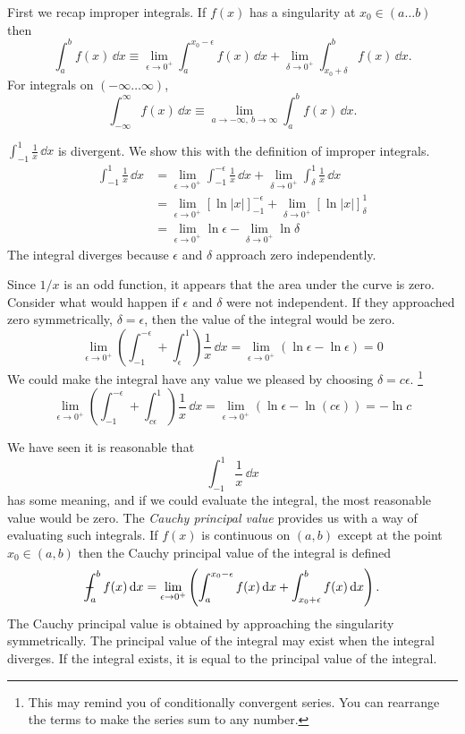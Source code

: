First we recap improper integrals.  If $f(x)$ has a singularity at
$x_0 \in (a \ldots b)$ then
\[
\int_a^b f(x) \,\dd x \equiv \lim_{\epsilon \to 0^+} \int_a^{x_0 - \epsilon} f(x) \,\dd x
+ \lim_{\delta \to 0^+} \int_{x_0 + \delta}^b f(x) \,\dd x.
\]
For integrals on $(-\infty \ldots \infty)$,
\[
\int_{-\infty}^\infty f(x) \,\dd x \equiv \lim_{a \to -\infty,\ b \to \infty} \int_a^b f(x) \,\dd x.
\]




\begin{Example}
  $\int_{-1}^1 \frac{1}{x} \,\dd x$ is divergent.  We show this with the definition 
  of improper integrals.
  \begin{align*}
    \int_{-1}^1 \frac{1}{x} \,\dd x
    &= \lim_{\epsilon \to 0^+} \int_{-1}^{-\epsilon} \frac{1}{x} \,\dd x
    + \lim_{\delta \to 0^+} \int_{\delta}^1 \frac{1}{x} \,\dd x \\
    &= \lim_{\epsilon \to 0^+} \left[ \ln|x| \right]_{-1}^{-\epsilon}
    + \lim_{\delta \to 0^+} \left[ \ln|x| \right]_\delta^1 \\
    &= \lim_{\epsilon \to 0^+} \ln \epsilon
    - \lim_{\delta \to 0^+} \ln \delta
  \end{align*}
  The integral diverges because $\epsilon$ and $\delta$ approach zero independently.

  Since $1 / x$ is an odd function, it appears that the area under the
  curve is zero.  Consider what would happen if $\epsilon$ and $\delta$ were not
  independent.  If they approached zero symmetrically, $\delta = \epsilon$, then
  the value of the integral would be zero.
  \[
  \lim_{\epsilon \to 0^+} \left( \int_{-1}^{-\epsilon} + \int_\epsilon^1 \right) \frac{1}{x} \,\dd x
  = \lim_{\epsilon \to 0^+} ( \ln \epsilon - \ln \epsilon ) = 0
  \]
  We could make the integral have any value we pleased by choosing $\delta = c \epsilon$.
  \footnote{This may remind you of conditionally convergent series.  You can 
    rearrange the terms to make the series sum to any number.}
  \[
  \lim_{\epsilon \to 0^+} \left( \int_{-1}^{-\epsilon} + \int_{c \epsilon}^1 \right) \frac{1}{x} \,\dd x
  = \lim_{\epsilon \to 0^+} ( \ln \epsilon - \ln(c \epsilon) ) = - \ln c
  \]
\end{Example}





We have seen it is reasonable that 
\[
\int_{-1}^1 \frac{1}{x} \,\dd x
\]
has some meaning, and if we could evaluate the integral, the most 
reasonable value would be zero.  The \textit{Cauchy principal value} 
provides us with a way of evaluating such integrals.
If $f(x)$ is continuous on $(a,b)$ except at the point $x_0 \in (a,b)$ then 
the Cauchy principal value of the integral is defined
\[
- \negthickspace \negthickspace \negthickspace \negmedspace \int_a^b f(x) \,\mathrm{d} x = \lim_{\epsilon \to 0^+} \left(
  \int_a^{x_0-\epsilon} f(x) \,\mathrm{d} x
  + \int_{x_0+\epsilon}^b f(x) \,\mathrm{d} x \right).
\]
The Cauchy principal value is obtained by approaching the singularity 
symmetrically.
The principal value of the integral may exist when the integral diverges.
If the integral exists, it is equal to the principal value of the integral.

